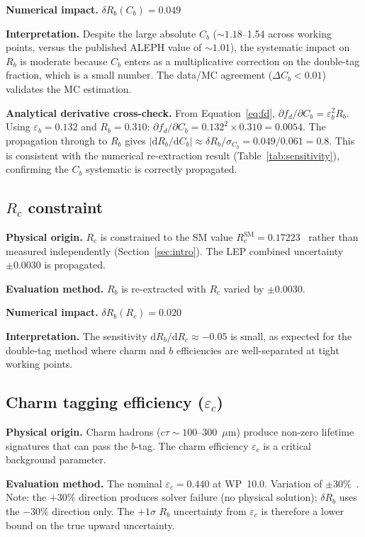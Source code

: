 \documentclass[11pt,a4paper]{article}
\begin{document}
\textbf{Numerical impact.}
$\delta R_b(C_b) = 0.049$

\textbf{Interpretation.} Despite the large absolute $C_b$ ($\sim 1.18$--1.54 across
working points, versus the published ALEPH value of $\sim 1.01$), the systematic impact
on $R_b$ is moderate because $C_b$ enters as a multiplicative correction on the
double-tag fraction, which is a small number. The data/MC agreement ($\Delta C_b < 0.01$)
validates the MC estimation.

\textbf{Analytical derivative cross-check.}
From Equation~\ref{eq:fd}, $\partial f_d / \partial C_b = \varepsilon_b^2 R_b$.
Using $\varepsilon_b = 0.132$ and $R_b = 0.310$:
$\partial f_d / \partial C_b = 0.132^2 \times 0.310 = 0.0054$.
The propagation through to $R_b$ gives
$|\mathrm{d}R_b/\mathrm{d}C_b| \approx \delta R_b / \sigma_{C_b} = 0.049 / 0.061 = 0.8$.
This is consistent with the numerical re-extraction result (Table~\ref{tab:sensitivity}),
confirming the $C_b$ systematic is correctly propagated.

\subsection{$R_c$ constraint}
\label{sec:syst_rc}

\textbf{Physical origin.} $R_c$ is constrained to the SM value
$R_c^\mathrm{SM} = 0.17223$~\cite{LEP:EWWG:2005} rather than measured independently
(Section~\ref{sec:intro}). The LEP combined uncertainty $\pm 0.0030$ is propagated.

\textbf{Evaluation method.} $R_b$ is re-extracted with $R_c$ varied by $\pm 0.0030$.

\textbf{Numerical impact.}
$\delta R_b(R_c) = 0.020$

\textbf{Interpretation.} The sensitivity $\mathrm{d}R_b/\mathrm{d}R_c \approx -0.05$
is small, as expected for the double-tag method where charm and $b$ efficiencies are
well-separated at tight working points.

\subsection{Charm tagging efficiency ($\varepsilon_c$)}
\label{sec:syst_eps_c}

\textbf{Physical origin.} Charm hadrons ($c\tau \sim 100$--300~$\mu$m) produce
non-zero lifetime signatures that can pass the $b$-tag. The charm efficiency
$\varepsilon_c$ is a critical background parameter.

\textbf{Evaluation method.} The nominal $\varepsilon_c = 0.440$
at WP~10.0. Variation of $\pm 30\%$~\cite{LEP:HF:2001}. Note: the $+30\%$ direction
produces solver failure (no physical solution); $\delta R_b$ uses the $-30\%$ direction
only. The $+1\sigma$ $R_b$ uncertainty from $\varepsilon_c$ is therefore a lower bound
on the true upward uncertainty.
\end{document}
